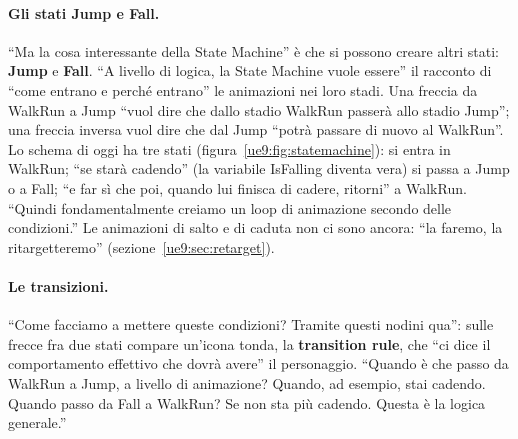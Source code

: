 \paragraph{Gli stati Jump e Fall.} ``Ma la cosa interessante della State Machine'' è che
si possono creare altri stati: \textbf{Jump} e \textbf{Fall}. ``A livello di logica, la
State Machine vuole essere'' il racconto di ``come entrano e perché entrano'' le
animazioni nei loro stadi. Una freccia da WalkRun a Jump ``vuol dire che dallo stadio
WalkRun passerà allo stadio Jump''; una freccia inversa vuol dire che dal Jump ``potrà
passare di nuovo al WalkRun''. Lo schema di oggi ha tre stati
(figura~\ref{ue9:fig:statemachine}): si entra in WalkRun; ``se starà cadendo'' (la
variabile IsFalling diventa vera) si passa a Jump o a Fall; ``e far sì che poi, quando
lui finisca di cadere, ritorni'' a WalkRun. ``Quindi fondamentalmente creiamo un loop di
animazione secondo delle condizioni.'' Le animazioni di salto e di caduta non ci sono
ancora: ``la faremo, la ritargetteremo'' (sezione~\ref{ue9:sec:retarget}).

\paragraph{Le transizioni.} ``Come facciamo a mettere queste condizioni? Tramite questi
nodini qua'': sulle frecce fra due stati compare un'icona tonda, la \textbf{transition
rule}, che ``ci dice il comportamento effettivo che dovrà avere'' il personaggio. ``Quando
è che passo da WalkRun a Jump, a livello di animazione? Quando, ad esempio, stai cadendo.
Quando passo da Fall a WalkRun? Se non sta più cadendo. Questa è la logica generale.''

